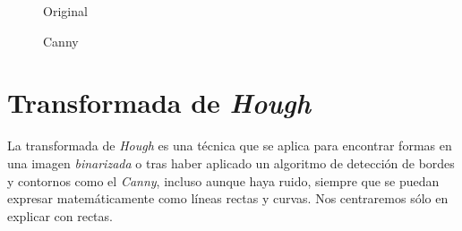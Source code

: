 \begin{figure}[H]
  \caption{Original}
  \centering \setlength\fboxsep{0pt} \setlength\fboxrule{0.5pt}
\end{figure}

\begin{figure}[H]
  \centering \setlength\fboxsep{0pt} \setlength\fboxrule{0.5pt}
  \caption{Canny}
\end{figure}

\section{Transformada de \emph{Hough}}\label{tecnica:hough}
La transformada de \emph{Hough} \emph{\citep*[Use of the hough
  trasformtion to detect lines and curves in pictures]{hart1971use}}
\emph{\citep*[4.3.2 Hough transforms]{szeliski2010computer}}
\emph{\citep*[5.2 Hough Transform]{toennies2012guide}} es una técnica
que se aplica para encontrar formas en una imagen \emph{binarizada} o
tras haber aplicado un algoritmo de detección de bordes y contornos
como el \emph{Canny}, incluso aunque haya ruido, siempre que se puedan
expresar matemáticamente como líneas rectas y curvas. Nos centraremos
sólo en explicar con rectas.
